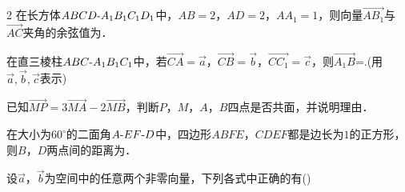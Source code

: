 \begin{multicols}{2}
 在长方体\(ABCD\text{-}\penalty100 A_1B_1C_1D_1\)中，\(AB=2\)，\(AD=2\)，\(AA_1=1\)，则向量\(\overrightarrow{AB_1}\)与\(\overrightarrow{AC}\)夹角的余弦值为\kongbai{}．
\begin{ansblock}[练-课时01-5]
\end{ansblock}

 在直三棱柱\(ABC\text{-}\penalty100 A_{1}B_{1}C_{1}\)中，若\(\overrightarrow{CA} = \overrightarrow{a}\)，\(\overrightarrow{CB} = \overrightarrow{b}\)，\(\overrightarrow{CC_{1}} = \overrightarrow{c}\)，则\nobreak\(\overrightarrow{A_{1}B}\)=\kongbai{}.(用\(\overrightarrow{a},\overrightarrow{b},\overrightarrow{c}\)表示)
\begin{ansblock}[练-课时01-6]
\end{ansblock}

 已知\(\overrightarrow{MP}=3\overrightarrow{MA}-2\overrightarrow{MB}\)，判断\(P\)，\(M\)，\(A\)，\(B\)四点是否共面，并说明理由．
\xiexwei{20mm}
\begin{ansblock}[练-课时01-7]
\end{ansblock}

 在大小为\(60^\circ\)的二面角\(A\text{-}\penalty100 EF\text{-}\penalty100 D\)中，四边形\(ABFE\)，\(CDEF\)都是边长为\(1\)的正方形，则\nobreak\(B\)，\(D\)两点间的距离为\kongbai{}．
\begin{ansblock}[练-课时01-8]
\end{ansblock}

\duoxuan{} 设\(\overrightarrow{a}\)，\(\overrightarrow{b}\)为空间中的任意两个非零向量，下列各式中正确的有(\kongwei)
\begin{ansblock}[练-课时01-9]
\end{ansblock}


\end{multicols}
